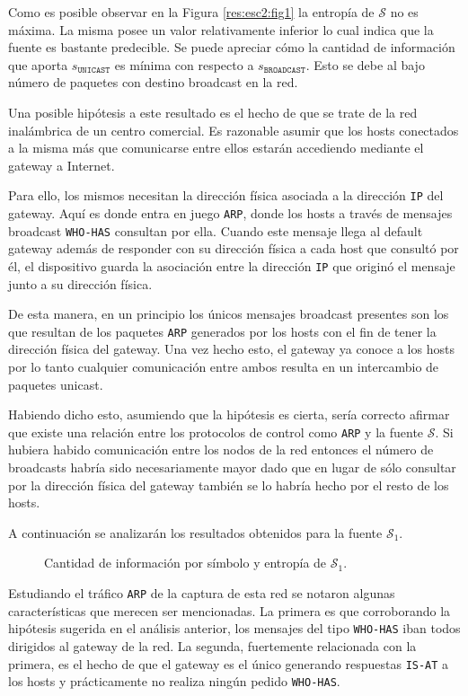 Como es posible observar en la Figura \ref{res:esc2:fig1} la entropía de
$\mathcal{S}$ no es máxima. La misma posee un valor relativamente inferior lo
cual indica que la fuente es bastante predecible. Se puede apreciar cómo la
cantidad de información que aporta $s_{\texttt{UNICAST}}$ es mínima con respecto
a $s_{\texttt{BROADCAST}}$. Esto se debe al bajo número de paquetes con destino
broadcast en la red.

Una posible hipótesis a este resultado es el hecho de que se trate de la red
inalámbrica de un centro comercial. Es razonable asumir que los hosts conectados
a la misma más que comunicarse entre ellos estarán accediendo mediante el
gateway a Internet.

Para ello, los mismos necesitan la dirección física asociada a la dirección
\texttt{IP} del gateway. Aquí es donde entra en juego \texttt{ARP}, donde los
hosts a través de mensajes broadcast \texttt{WHO-HAS} consultan por ella. Cuando
este mensaje llega al default gateway además de responder con su dirección
física a cada host que consultó por él, el dispositivo guarda la asociación
entre la dirección \texttt{IP} que originó el mensaje junto a su dirección física.

De esta manera, en un principio los únicos mensajes broadcast presentes son los
que resultan de los paquetes \texttt{ARP} generados por los hosts con el fin de
tener la dirección física del gateway. Una vez hecho esto, el gateway ya conoce
a los hosts por lo tanto cualquier comunicación entre ambos resulta en un
intercambio de paquetes unicast.

Habiendo dicho esto, asumiendo que la hipótesis es cierta, sería correcto
afirmar que existe una relación entre los protocolos de control como
\texttt{ARP} y la fuente $\mathcal{S}$. Si hubiera habido comunicación entre los
nodos de la red entonces el número de broadcasts habría sido necesariamente
mayor dado que en lugar de sólo consultar por la dirección física del gateway
también se lo habría hecho por el resto de los hosts.

A continuación se analizarán los resultados obtenidos para la fuente
$\mathcal{S}_1$.

\begin{figure}[h]
	\caption{Cantidad de información por símbolo y entropía de $\mathcal{S}_1$.}
    \label{res:esc2:fig2}
\end{figure}

Estudiando el tráfico \texttt{ARP} de la captura de esta red se notaron algunas
características que merecen ser mencionadas. La primera es que corroborando la
hipótesis sugerida en el análisis anterior, los mensajes del tipo
\texttt{WHO-HAS} iban todos dirigidos al gateway de la red. La segunda,
fuertemente relacionada con la primera, es el hecho de que el gateway es el
único generando respuestas \texttt{IS-AT} a los hosts y prácticamente no realiza
ningún pedido \texttt{WHO-HAS}.

